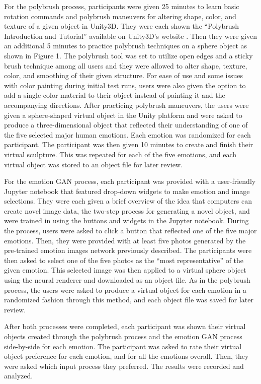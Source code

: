 \documentclass{sigchi}
\begin{document}
For the polybrush process, participants were given 25 minutes to learn basic rotation commands and polybrush maneuvers for altering shape, color, and texture of a given object in Unity3D. They were each shown the “Polybrush Introduction and Tutorial” available on Unity3D’s website \cite{polybrush}. Then they were given an additional 5 minutes to practice polybrush techniques on a sphere object as shown in Figure 1. The polybrush tool was set to utilize open edges and a sticky brush technique among all users and they were allowed to alter shape, texture, color, and smoothing of their given structure. For ease of use and some issues with color painting during initial test runs, users were also given the option to add a single-color material to their object instead of painting it and the accompanying directions. After practicing polybrush maneuvers, the users were given a sphere-shaped virtual object in the Unity platform and were asked to produce a three-dimensional object that reflected their understanding of one of the five selected major human emotions. Each emotion was randomized for each participant. The participant was then given 10 minutes to create and finish their virtual sculpture. This was repeated for each of the five emotions, and each virtual object was stored to an object file for later review.

For the emotion GAN process, each participant was provided with a user-friendly Jupyter notebook that featured drop-down widgets to make emotion and image selections. They were each given a brief overview of the idea that computers can create novel image data, the two-step process for generating a novel object, and were trained in using the buttons and widgets in the Jupyter notebook. During the process, users were asked to click a button that reflected one of the five major emotions. Then, they were provided with at least five photos generated by the pre-trained emotion images network previously described. The participants were then asked to select one of the five photos as the “most representative” of the given emotion. This selected image was then applied to a virtual sphere object using the neural renderer and downloaded as an object file. As in the polybrush process, the users were asked to produce a virtual object for each emotion in a randomized fashion through this method, and each object file was saved for later review.  

After both processes were completed, each participant was shown their virtual objects created through the polybrush process and the emotion GAN process side-by-side for each emotion. The participant was asked to rate their virtual object preference for each emotion, and for all the emotions overall. Then, they were asked which input process they preferred. The results were recorded and analyzed. 
\end{document}
